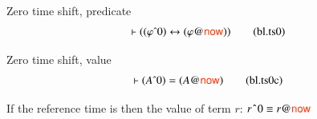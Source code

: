 \begin{lemma} {Zero time shift, predicate}
\begin{align}
\vdash ( ( \varphi \string^ 0 ) \leftrightarrow ( \varphi @ \mathsf{\msc{now}}
    ) )\label{eq:bl.ts0}\tag{bl.ts0}
\end{align}
\end{lemma}

\begin{lemma} {Zero time shift, value}
\begin{align}
\vdash ( A \string^ 0 ) = ( A @ \mathsf{\msc{now}}
    )\label{eq:bl.ts0c}\tag{bl.ts0c}
\end{align}
\end{lemma}

 If the reference time is  then the value of term $r$:  \(r$\texttt{\^}$0 \equiv  r@\mathsf{\msc{now}} \)
 
 
 
 
 
 
